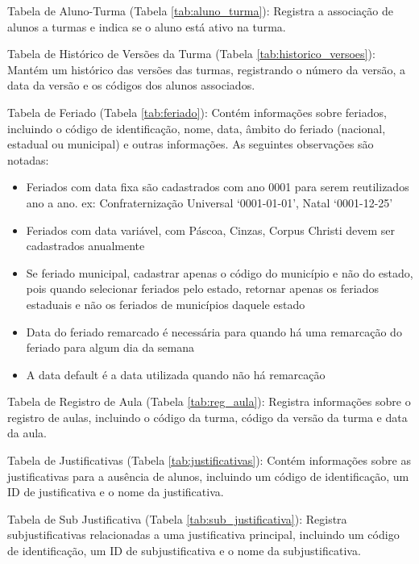 Tabela de Aluno-Turma (Tabela \ref{tab:aluno_turma}): Registra a associação de alunos a turmas e indica se o aluno está ativo na turma.

Tabela de Histórico de Versões da Turma (Tabela \ref{tab:historico_versoes}): Mantém um histórico das versões das turmas, registrando o número da versão, a data da versão e os códigos dos alunos associados.

Tabela de Feriado (Tabela \ref{tab:feriado}): Contém informações sobre feriados, incluindo o código de identificação, nome, data, âmbito do feriado (nacional, estadual ou municipal) e outras informações. As seguintes observações são notadas:

\begin{itemize}
    \item Feriados com data fixa são cadastrados com ano 0001 para serem reutilizados ano a ano. ex: Confraternização Universal ‘0001-01-01’, Natal ‘0001-12-25’

    \item Feriados com data variável, com Páscoa, Cinzas, Corpus Christi devem ser cadastrados anualmente

    \item Se feriado municipal, cadastrar apenas o código do município e não do estado, pois quando selecionar feriados pelo estado, retornar apenas os feriados estaduais e não os feriados de municípios daquele estado

    \item Data do feriado remarcado é necessária para quando há uma remarcação do feriado para algum dia da semana

    \item A data default é a data utilizada quando não há remarcação
\end{itemize}

Tabela de Registro de Aula (Tabela \ref{tab:reg_aula}): Registra informações sobre o registro de aulas, incluindo o código da turma, código da versão da turma e data da aula.

Tabela de Justificativas (Tabela \ref{tab:justificativas}): Contém informações sobre as justificativas para a ausência de alunos, incluindo um código de identificação, um ID de justificativa e o nome da justificativa.

Tabela de Sub Justificativa (Tabela \ref{tab:sub_justificativa}): Registra subjustificativas relacionadas a uma justificativa principal, incluindo um código de identificação, um ID de subjustificativa e o nome da subjustificativa.



